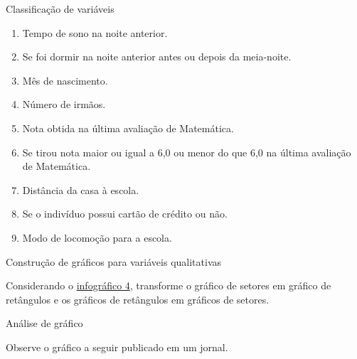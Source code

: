 {\begin{task}{ Classificação de variáveis}
\begin{enumerate}
\item {} 
Tempo de sono na noite anterior.

\item {} 
Se foi dormir na noite anterior antes ou depois da meia-noite.

\item {} 
Mês de nascimento.

\item {} 
Número de irmãos.

\item {} 
Nota obtida na última avaliação de Matemática.

\item {} 
Se tirou nota maior ou igual a 6,0 ou menor do que 6,0 na última avaliação de Matemática.

\item {} 
Distância da casa à escola.

\item {} 
Se o indivíduo possui cartão de crédito ou não.

\item {} 
Modo de locomoção para a escola.

\end{enumerate}
\end{task}
\clearpage
{}\label{est1-ativ-7}

\begin{task}{ Construção de gráficos para variáveis qualitativas}

Considerando o \hyperref[est1-fig-5]{infográfico 4}, transforme o gráfico de setores em gráfico de retângulos e os gráficos de retângulos em gráficos de setores.
\end{task}

\label{est1-ativ-8}
\begin{task}{ Análise de gráfico}

Observe o gráfico a seguir publicado em um jornal.

\begin{figure}[H]
\centering
{}
\end{figure}
\end{task}}
